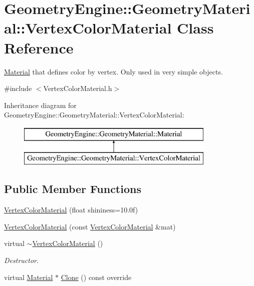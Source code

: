 \hypertarget{class_geometry_engine_1_1_geometry_material_1_1_vertex_color_material}{}\section{Geometry\+Engine\+::Geometry\+Material\+::Vertex\+Color\+Material Class Reference}
\label{class_geometry_engine_1_1_geometry_material_1_1_vertex_color_material}


\mbox{\hyperlink{class_geometry_engine_1_1_geometry_material_1_1_material}{Material}} that defines color by vertex. Only used in very simple objects.  




{\ttfamily \#include $<$Vertex\+Color\+Material.\+h$>$}

Inheritance diagram for Geometry\+Engine\+::Geometry\+Material\+::Vertex\+Color\+Material\+:\begin{figure}[H]
\begin{center}
\leavevmode
\includegraphics[height=2.000000cm]{class_geometry_engine_1_1_geometry_material_1_1_vertex_color_material}
\end{center}
\end{figure}
\subsection*{Public Member Functions}
\begin{DoxyCompactItemize}
\item 
\mbox{\hyperlink{class_geometry_engine_1_1_geometry_material_1_1_vertex_color_material_a88282e8360bd9250a97690454b787a2f}{Vertex\+Color\+Material}} (float shininess=10.\+0f)
\item 
\mbox{\hyperlink{class_geometry_engine_1_1_geometry_material_1_1_vertex_color_material_a34c914dc6b12a60e92116b5810d438a4}{Vertex\+Color\+Material}} (const \mbox{\hyperlink{class_geometry_engine_1_1_geometry_material_1_1_vertex_color_material}{Vertex\+Color\+Material}} \&mat)
\item 
\mbox{\label{class_geometry_engine_1_1_geometry_material_1_1_vertex_color_material_aa34ff05271ac73009e44ecc3100e5f40}} 
virtual \mbox{\hyperlink{class_geometry_engine_1_1_geometry_material_1_1_vertex_color_material_aa34ff05271ac73009e44ecc3100e5f40}{$\sim$\+Vertex\+Color\+Material}} ()
\begin{DoxyCompactList}\small\item\em Destructor. \end{DoxyCompactList}\item 
virtual \mbox{\hyperlink{class_geometry_engine_1_1_geometry_material_1_1_material}{Material}} $\ast$ \mbox{\hyperlink{class_geometry_engine_1_1_geometry_material_1_1_vertex_color_material_aecf808e45985f2a39662937fc18a21d0}{Clone}} () const override
\end{DoxyCompactItemize}
